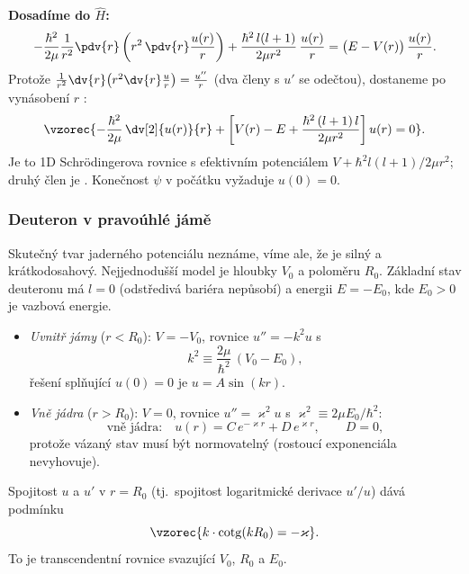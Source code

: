\textbf{Dosadíme do \(\hat H\):}
\[
  -\frac{\hbar^2}{2\mu}\frac{1}{r^2}\pdv{r}\left(r^2\,\pdv{r}\frac{u(r)}{r}\right)
  + \frac{\hbar^2\,l(l+1)}{2\mu r^2}\,\frac{u(r)}{r}
  = \big(E - V(r)\big)\,\frac{u(r)}{r} .
\]
Protože \(\frac{1}{r^2}\dv{r}\big(r^2\dv{r}\frac{u}{r}\big) = \frac{u''}{r}\)
(dva členy s \(u'\) se odečtou), dostaneme po vynásobení \(r\)
:
\[
  \vzorec{-\frac{\hbar^2}{2\mu}\,\dv[2]{u(r)}{r}
  + \left[V(r) - E + \frac{\hbar^2\,(l+1)\,l}{2\mu r^2}\right]u(r) = 0} .
\]
Je to 1D Schrödingerova rovnice s efektivním potenciálem
\(V + \hbar^2l(l+1)/2\mu r^2\); druhý člen je .
Konečnost \(\psi\) v počátku vyžaduje \(u(0)=0\).

\subsubsection*{Deuteron v pravoúhlé jámě}

Skutečný tvar jaderného potenciálu neznáme, víme ale, že je silný
a krátkodosahový. Nejjednodušší model je 
hloubky \(V_0\) a poloměru \(R_0\). Základní stav deuteronu má \(l=0\)
(odstředivá bariéra nepůsobí) a energii \(E=-E_0\), kde \(E_0>0\) je vazbová
energie.
\begin{center}
\end{center}
\begin{itemize}
  \item \emph{Uvnitř jámy} (\(r<R_0\)): \(V=-V_0\), rovnice
    \(u'' = -k^2u\) s
    \[
      k^2 \equiv \frac{2\mu}{\hbar^2}\,(V_0 - E_0) ,
    \]
    řešení splňující \(u(0)=0\) je \(u = A\sin(kr)\).
  \item \emph{Vně jádra} (\(r>R_0\)): \(V=0\), rovnice \(u''=\varkappa^2u\)
    s \(\varkappa^2 \equiv 2\mu E_0/\hbar^2\):
    \[
      \text{vně jádra:}\quad u(r) = C\,e^{-\varkappa r} + D\,e^{\varkappa r},
      \qquad D = 0 ,
    \]
    protože vázaný stav musí být normovatelný (rostoucí exponenciála
    nevyhovuje).
\end{itemize}
Spojitost \(u\) a \(u'\) v \(r=R_0\) (tj.\ spojitost logaritmické derivace
\(u'/u\)) dává podmínku
\[
  \vzorec{k\cdot\operatorname{cotg}(k R_0) = -\varkappa} .
\]
To je transcendentní rovnice svazující \(V_0\), \(R_0\) a \(E_0\).

